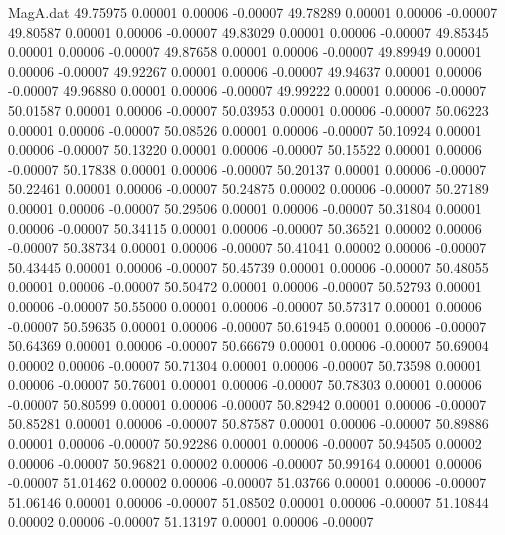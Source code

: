 \begin{filecontents}{MagA.dat}
  49.75975    0.00001    0.00006   -0.00007
  49.78289    0.00001    0.00006   -0.00007
  49.80587    0.00001    0.00006   -0.00007
  49.83029    0.00001    0.00006   -0.00007
  49.85345    0.00001    0.00006   -0.00007
  49.87658    0.00001    0.00006   -0.00007
  49.89949    0.00001    0.00006   -0.00007
  49.92267    0.00001    0.00006   -0.00007
  49.94637    0.00001    0.00006   -0.00007
  49.96880    0.00001    0.00006   -0.00007
  49.99222    0.00001    0.00006   -0.00007
  50.01587    0.00001    0.00006   -0.00007
  50.03953    0.00001    0.00006   -0.00007
  50.06223    0.00001    0.00006   -0.00007
  50.08526    0.00001    0.00006   -0.00007
  50.10924    0.00001    0.00006   -0.00007
  50.13220    0.00001    0.00006   -0.00007
  50.15522    0.00001    0.00006   -0.00007
  50.17838    0.00001    0.00006   -0.00007
  50.20137    0.00001    0.00006   -0.00007
  50.22461    0.00001    0.00006   -0.00007
  50.24875    0.00002    0.00006   -0.00007
  50.27189    0.00001    0.00006   -0.00007
  50.29506    0.00001    0.00006   -0.00007
  50.31804    0.00001    0.00006   -0.00007
  50.34115    0.00001    0.00006   -0.00007
  50.36521    0.00002    0.00006   -0.00007
  50.38734    0.00001    0.00006   -0.00007
  50.41041    0.00002    0.00006   -0.00007
  50.43445    0.00001    0.00006   -0.00007
  50.45739    0.00001    0.00006   -0.00007
  50.48055    0.00001    0.00006   -0.00007
  50.50472    0.00001    0.00006   -0.00007
  50.52793    0.00001    0.00006   -0.00007
  50.55000    0.00001    0.00006   -0.00007
  50.57317    0.00001    0.00006   -0.00007
  50.59635    0.00001    0.00006   -0.00007
  50.61945    0.00001    0.00006   -0.00007
  50.64369    0.00001    0.00006   -0.00007
  50.66679    0.00001    0.00006   -0.00007
  50.69004    0.00002    0.00006   -0.00007
  50.71304    0.00001    0.00006   -0.00007
  50.73598    0.00001    0.00006   -0.00007
  50.76001    0.00001    0.00006   -0.00007
  50.78303    0.00001    0.00006   -0.00007
  50.80599    0.00001    0.00006   -0.00007
  50.82942    0.00001    0.00006   -0.00007
  50.85281    0.00001    0.00006   -0.00007
  50.87587    0.00001    0.00006   -0.00007
  50.89886    0.00001    0.00006   -0.00007
  50.92286    0.00001    0.00006   -0.00007
  50.94505    0.00002    0.00006   -0.00007
  50.96821    0.00002    0.00006   -0.00007
  50.99164    0.00001    0.00006   -0.00007
  51.01462    0.00002    0.00006   -0.00007
  51.03766    0.00001    0.00006   -0.00007
  51.06146    0.00001    0.00006   -0.00007
  51.08502    0.00001    0.00006   -0.00007
  51.10844    0.00002    0.00006   -0.00007
  51.13197    0.00001    0.00006   -0.00007

\end{filecontents}
